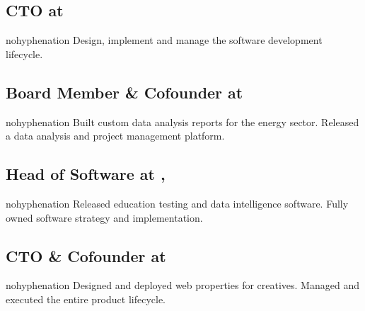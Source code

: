 \fullwidthmode
{
\subsection{\textbf{CTO} at  \shyears{[2015-PRESENT]}}
\begin{sloppypar}\begin{hyphenrules}{nohyphenation}
\small{Design, implement and manage the software development lifecycle.}
\end{hyphenrules}\end{sloppypar}
\medskip

\subsection{\textbf{Board Member \& Cofounder} at  \shyears{[2011-PRESENT]}}
\begin{sloppypar}\begin{hyphenrules}{nohyphenation}
\small{Built custom data analysis reports for the energy sector.  Released a data analysis and project management platform.}
\end{hyphenrules}\end{sloppypar}
\medskip

\subsection{\textbf{Head of Software} at ,  \shyears{[2008-2014]}}
\begin{sloppypar}\begin{hyphenrules}{nohyphenation}
\small{Released education testing and data intelligence software.  Fully owned software strategy and implementation.}
\end{hyphenrules}\end{sloppypar}
\medskip

\subsection{\textbf{CTO \& Cofounder} at  \shyears{[2006-2008]}}
\begin{sloppypar}\begin{hyphenrules}{nohyphenation}
\small{Designed and deployed web properties for creatives.  Managed and executed the entire product lifecycle.}
\end{hyphenrules}\end{sloppypar}
\medskip

}
